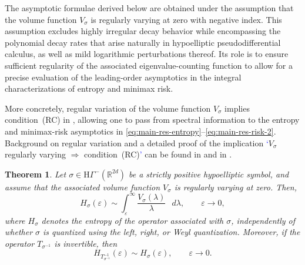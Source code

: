 \documentclass[a4paper,12pt]{article}
\newtheorem{theorem}{Theorem}%
\newcommand{\R}{\mathbb{R}}
\newcommand{\diff}{\mathop{}\!d}
\newcommand{\hyponegclass}{\mathrm{H}\Gamma^-}
\newcommand{\symbolnot}{\sigma}
\begin{document}
The asymptotic formulae derived below are obtained under the assumption that the
volume function $V_\sigma$ is regularly varying at zero with negative index.
This assumption excludes highly irregular decay behavior while encompassing
the polynomial decay rates that arise naturally in hypoelliptic
pseudodifferential calculus, as well as mild logarithmic perturbations thereof. Its role is to ensure sufficient
regularity of the associated eigenvalue-counting function to allow for a precise
evaluation of the leading-order asymptotics in the integral characterizations of entropy
and minimax risk.

More concretely, regular variation of the volume function $V_\sigma$ implies
condition~(RC) in \cite[Theorem~2]{allard2025metricentropyminimaxrisk}, %
allowing one to pass from spectral information to the entropy and minimax-risk asymptotics
in \eqref{eq:main-res-entropy}--\eqref{eq:main-res-risk-2}.
Background on regular variation and a detailed proof of the implication
\textcolor{blue}{`}$V_\sigma$ regularly varying $\Rightarrow$ condition~(RC)\textcolor{blue}{'} can be found in
\cite{binghamRegularVariation1987} and in
\cite[Appendix~C]{allard2025metricentropyminimaxrisk}.






\begin{theorem}\label{thm:main-result}
Let $\sigma\in\hyponegclass(\R^{2d})$ be a strictly positive hypoelliptic symbol, and
assume that the associated volume function $V_\sigma$ is regularly varying at
zero. %
Then,
\begin{equation}\label{eq:main-res-volume-integral}
    H_\sigma(\varepsilon)
    \sim
    \int_{\varepsilon}^{\infty}
        \frac{V_\sigma(\lambda)}{\lambda}\,\diff\lambda,
    \qquad \varepsilon\to0,
\end{equation}
where $H_\sigma$ denotes the entropy of the operator associated with $\sigma$,
independently of whether $\sigma$ is quantized using the left, right, or Weyl
quantization. Moreover, if the operator $T_{\sigma^{-1}}$ is invertible, then
\begin{equation}\label{eq:main-result-part2}
    H_{T^{-1}_{\sigma^{-1}}}(\varepsilon)
    \sim
    H_\sigma(\varepsilon),
    \qquad \varepsilon\to0.
\end{equation}
\end{theorem}
\end{document}
